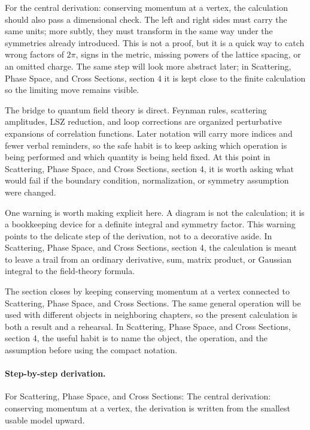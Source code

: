 For the central derivation: conserving momentum at a vertex, the calculation should also pass a dimensional check.  The left and right sides must carry the same units; more subtly, they must transform in the same way under the symmetries already introduced.  This is not a proof, but it is a quick way to catch wrong factors of \(2\pi\), signs in the metric, missing powers of the lattice spacing, or an omitted charge.  The same step will look more abstract later; in Scattering, Phase Space, and Cross Sections, section 4 it is kept close to the finite calculation so the limiting move remains visible.

The bridge to quantum field theory is direct.  Feynman rules, scattering amplitudes, LSZ reduction, and loop corrections are organized perturbative expansions of correlation functions.  Later notation will carry more indices and fewer verbal reminders, so the safe habit is to keep asking which operation is being performed and which quantity is being held fixed.  At this point in Scattering, Phase Space, and Cross Sections, section 4, it is worth asking what would fail if the boundary condition, normalization, or symmetry assumption were changed.

One warning is worth making explicit here.  A diagram is not the calculation; it is a bookkeeping device for a definite integral and symmetry factor.  This warning points to the delicate step of the derivation, not to a decorative aside.  In Scattering, Phase Space, and Cross Sections, section 4, the calculation is meant to leave a trail from an ordinary derivative, sum, matrix product, or Gaussian integral to the field-theory formula.

The section closes by keeping conserving momentum at a vertex connected to Scattering, Phase Space, and Cross Sections.  The same general operation will be used with different objects in neighboring chapters, so the present calculation is both a result and a rehearsal.  In Scattering, Phase Space, and Cross Sections, section 4, the useful habit is to name the object, the operation, and the assumption before using the compact notation.



\paragraph{Step-by-step derivation.}

For Scattering, Phase Space, and Cross Sections: The central derivation: conserving momentum at a vertex, the derivation is written from the smallest usable model upward.

